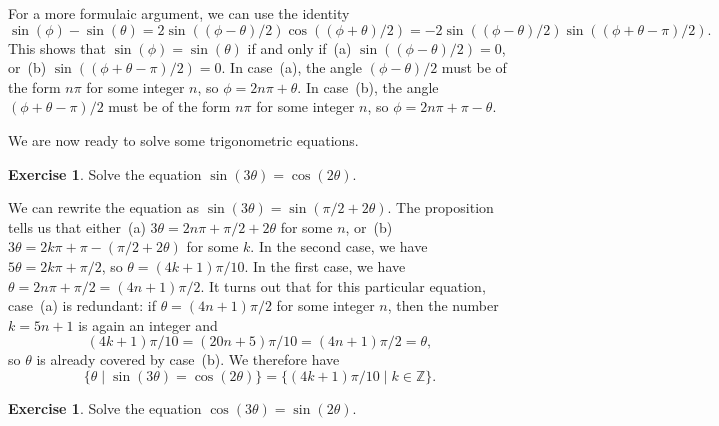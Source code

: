 \documentclass[a4paper]{book}
\newcommand{\Z}         {{\mathbb{Z}}}
\newcommand{\tht}       {\theta}
\newcommand{\st}        {\;|\;}
\renewcommand{\:}{\colon}
\theoremstyle{definition}
\newtheorem{exercise}[theorem]{Exercise}
\renewenvironment{solution}{\SolutionInline}{\endSolutionInline}
\begin{document}
For a more formulaic argument, we can use the identity
\[ \sin(\phi)-\sin(\tht) =
    2\sin((\phi-\tht)/2)\cos((\phi+\tht)/2) =
    -2\sin((\phi-\tht)/2)\sin((\phi+\tht-\pi)/2).
\]
This shows that $\sin(\phi)=\sin(\tht)$ if and only if~(a)
$\sin((\phi-\tht)/2)=0$, or~(b) $\sin((\phi+\tht-\pi)/2)=0$.
In case~(a), the angle $(\phi-\tht)/2$ must be of the form $n\pi$ for
some integer $n$, so $\phi=2n\pi+\tht$.  In case~(b), the angle
$(\phi+\tht-\pi)/2$ must be of the form $n\pi$ for some integer $n$, 
so $\phi=2n\pi+\pi-\tht$.

We are now ready to solve some trigonometric equations.
\begin{exercise}
 Solve the equation $\sin(3\tht)=\cos(2\tht)$.
\end{exercise}
\begin{solution}
 We can rewrite the equation as $\sin(3\tht)=\sin(\pi/2+2\tht)$.  The
 proposition tells us that either~(a) $3\tht=2n\pi+\pi/2+2\tht$ for
 some $n$, or~(b) $3\tht=2k\pi+\pi-(\pi/2+2\tht)$ for some $k$.  In the
 second case, we have $5\tht=2k\pi+\pi/2$, so $\tht=(4k+1)\pi/10$.  In
 the first case, we have $\tht=2n\pi+\pi/2=(4n+1)\pi/2$.  It turns out
 that for this particular equation, case~(a) is redundant: if
 $\tht=(4n+1)\pi/2$ for some integer $n$, then the number $k=5n+1$ is
 again an integer and 
 \[ (4k+1)\pi/10=(20n+5)\pi/10=(4n+1)\pi/2=\tht, \]
 so $\tht$ is already covered by case~(b).  We therefore have
 \[ \{\tht\st\sin(3\tht)=\cos(2\tht)\} = 
      \{(4k+1)\pi/10\st k\in\Z\}.
 \]
\end{solution}
\begin{exercise}
 Solve the equation $\cos(3\tht)=\sin(2\tht)$.
\end{exercise}
\end{document}
